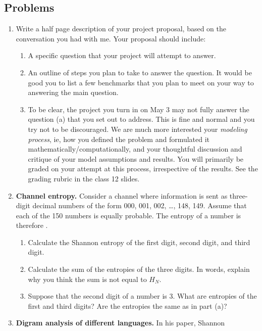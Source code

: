 \documentclass[12pt]{article}
\begin{document}
\subsection*{Problems}
\begin{enumerate}

\item Write a half page description of your project proposal, based on the conversation you had with me.  Your proposal should include:
\begin{enumerate}
\item A specific question that your project will attempt to answer.
\item An outline of steps you plan to take to answer the question.  It would be good you to list a few benchmarks that you plan to  meet on your way to answering the main question.  
\item To be clear, the project you turn in on May 3 may not fully answer the question (a) that you set out to address.  This is fine and normal and you try not to be discouraged.  We are much more interested your \textit{modeling process}, ie, how you defined the problem and formulated it mathematically/computationally, and your thoughtful discussion and critique of your model assumptions and results.  You will primarily be graded on your attempt at this process, irrespective of the results.  See the grading rubric in the class 12 slides.
\end{enumerate}
  \item \textbf{Channel entropy.} Consider a channel where information is sent as
    three-digit decimal numbers of the form 000, 001, 002, \ldots, 148, 149.
    Assume that each of the 150 numbers is equally probable. The entropy of a
    number is therefore .
    \begin{enumerate}
      \item Calculate the Shannon entropy of the first digit, second digit, and
	third digit.
      \item Calculate the sum of the entropies of the three digits.  In words, explain why you think the
	sum is not equal to $H_N$.
      \item Suppose that the second digit of a number is 3. What are entropies
	of the first and third digits? Are the entropies the same as in part
	(a)?
    \end{enumerate}
     \item \textbf{Digram analysis of different languages.} In his paper, Shannon

\end{enumerate}
\end{document}
